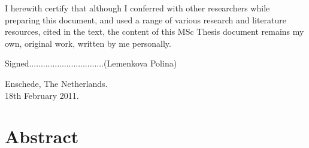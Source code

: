 \documentclass[11pt]{article}
\begin{document}
\vspace{3em}

		I herewith certify that although I conferred with other researchers while preparing this document, and used a range of various research and literature 			resources, cited in the text, the content of this MSc Thesis document remains my own, original work, written by me personally. \\

\vspace{1em}

		Signed................................(Lemenkova Polina) \\

\vspace{1em}

		Enschede, The Netherlands. \\ 18th February 2011.
\pagebreak

\section*{Abstract}
\end{document}
